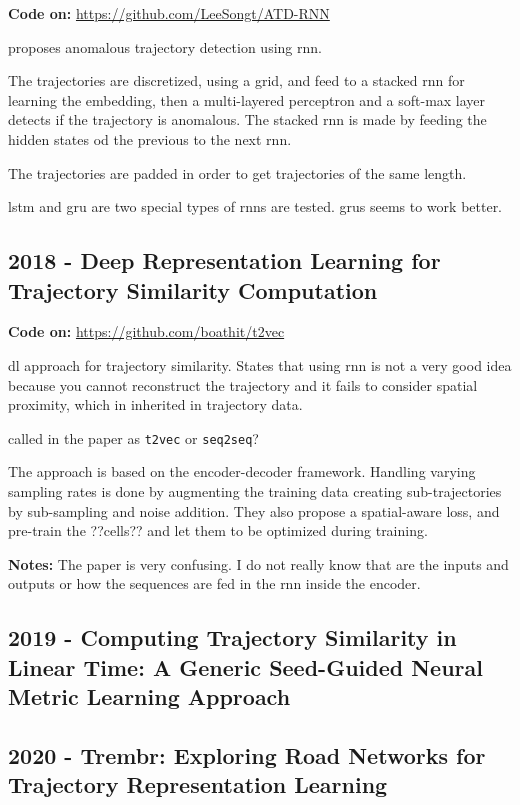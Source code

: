 \textbf{Code on:} \url{https://github.com/LeeSongt/ATD-RNN}

\cite{song2018anomalous} proposes anomalous trajectory detection using \gls{rnn}.

The trajectories are discretized, using a grid, and feed to a stacked \gls{rnn} for learning the embedding, then a multi-layered perceptron and a soft-max layer detects if the trajectory is anomalous.
%
The stacked \gls{rnn} is made by feeding the hidden states od the previous to the next \gls{rnn}.

The trajectories are padded in order to get trajectories of the same length.

\gls{lstm} and \gls{gru} are two special types of \glspl{rnn} are tested. \glspl{gru} seems to work better.

\subsection*{2018 - Deep Representation Learning for Trajectory Similarity Computation}

\textbf{Code on:} \url{https://github.com/boathit/t2vec}

\cite{li2018deep} \gls{dl} approach for trajectory similarity. States that using \gls{rnn} is not a very good idea because you cannot reconstruct the trajectory and it fails to consider spatial proximity, which in inherited in trajectory data.

called in the paper as \texttt{t2vec} or \texttt{seq2seq}?

The approach is based on the encoder-decoder framework.
%
Handling varying sampling rates is done by augmenting the training data creating sub-trajectories by sub-sampling and noise addition. They also propose a spatial-aware loss, and pre-train the ??cells?? and let them to be optimized during training.

\textbf{Notes:} The paper is very confusing. I do not really know that are the inputs and outputs or how the sequences are fed in the \gls{rnn} inside the encoder.

\subsection*{2019 - Computing Trajectory Similarity in Linear Time: A Generic Seed-Guided Neural Metric Learning Approach}
\cite{yao2019computing}

\subsection*{2020 - Trembr: Exploring Road Networks for Trajectory Representation Learning}

